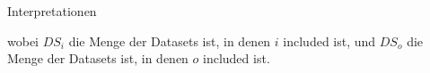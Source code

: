 \documentclass[18pt]{beamer}
\begin{document}
\begin{frame}[fragile,t]{Interpretationen}
\vfill

\begin{overprint}
wobei $DS_i$ die Menge der Datasets ist, in denen $i$ included ist, und
      $DS_o$ die Menge der Datasets ist, in denen $o$ included ist.
\end{overprint}


\end{frame}
\appendix
\beginbackup


\backupend
\end{document}
